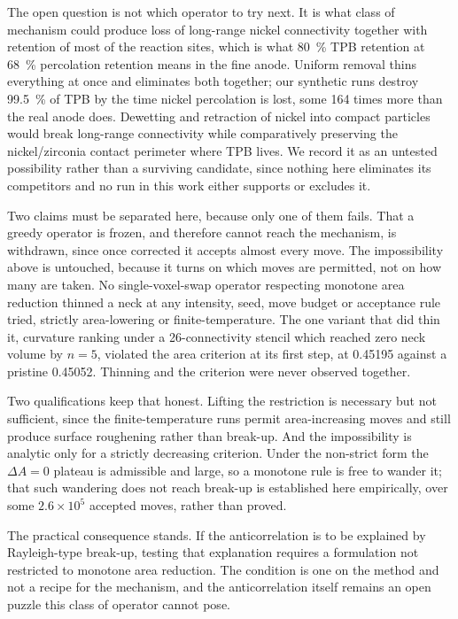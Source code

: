 \documentclass[5p,times,twocolumn]{elsarticle}
\begin{document}
The open question is not which operator to try next. It is what class of
mechanism could produce loss of long-range nickel connectivity together with
retention of most of the reaction sites, which is what \SI{80}{\percent} TPB
retention at \SI{68}{\percent} percolation retention means in the fine anode.
Uniform removal thins everything at once and eliminates both together; our
synthetic runs destroy \SI{99.5}{\percent} of TPB by the time nickel
percolation is lost, some 164 times more than the real anode does. Dewetting
and retraction of nickel into compact particles would break long-range
connectivity while comparatively preserving the nickel/zirconia contact
perimeter where TPB lives. We record it as an untested possibility rather than
a surviving candidate, since nothing here eliminates its competitors and no run
in
this work either supports or excludes it.

Two claims must be separated here, because only one of them fails. That a
greedy operator is frozen, and therefore cannot reach the mechanism, is
withdrawn, since once corrected it accepts almost every move. The impossibility
above is
untouched, because it turns on which moves are permitted, not on how
many are taken. No single-voxel-swap operator respecting monotone area
reduction thinned a neck at any intensity, seed, move budget or acceptance rule
tried, strictly area-lowering or finite-temperature. The one variant that did
thin it, curvature ranking under a 26-connectivity stencil which reached zero
neck volume by $n=5$, violated the area criterion at its first step, at
0.45195 against a pristine 0.45052. Thinning and the criterion were never
observed together.

Two qualifications keep that honest. Lifting the restriction is necessary but
not sufficient, since the finite-temperature runs permit area-increasing moves
and
still produce surface roughening rather than break-up. And the impossibility is
analytic only for a strictly decreasing criterion. Under the non-strict form
the $\Delta A = 0$ plateau is admissible and large, so a monotone rule is free
to wander it; that such wandering does not reach break-up is established here
empirically, over some $2.6\times10^{5}$ accepted moves, rather than proved.

The practical consequence stands. If the anticorrelation is to be explained by
Rayleigh-type break-up, testing that explanation requires a formulation not
restricted to monotone area reduction. The condition is one on the method and not a recipe for the mechanism, and the
anticorrelation itself remains
an open puzzle this class of operator cannot pose.
\end{document}
